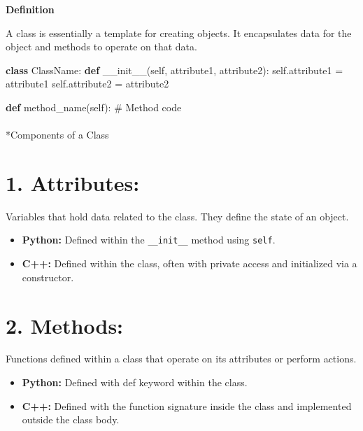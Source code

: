 \documentclass[
  letterpaper,
  DIV=11,
  numbers=noendperiod]{scrreprt}
\makeatletter
\let\oldparagraph\paragraph
\renewcommand{\paragraph}{
    \@ifstar
      \xxxParagraphStar
      \xxxParagraphNoStar
  }
\newcommand{\xxxParagraphStar}[1]{\oldparagraph*{#1}\mbox{}}
\newcommand{\xxxParagraphNoStar}[1]{\oldparagraph{#1}\mbox{}}
\newenvironment{Shaded}{\begin{snugshade}}{\end{snugshade}}
\newcommand{\CommentTok}[1]{\textcolor[rgb]{0.37,0.37,0.37}{#1}}
\newcommand{\FunctionTok}[1]{\textcolor[rgb]{0.28,0.35,0.67}{#1}}
\newcommand{\KeywordTok}[1]{\textcolor[rgb]{0.00,0.23,0.31}{\textbf{#1}}}
\newcommand{\NormalTok}[1]{\textcolor[rgb]{0.00,0.23,0.31}{#1}}
\newcommand{\OperatorTok}[1]{\textcolor[rgb]{0.37,0.37,0.37}{#1}}
\newcommand{\VariableTok}[1]{\textcolor[rgb]{0.07,0.07,0.07}{#1}}
\providecommand{\tightlist}{%
  \setlength{\itemsep}{0pt}\setlength{\parskip}{0pt}}
\makeatother
\begin{document}
\textbf{Definition}

A class is essentially a template for creating objects. It encapsulates
data for the object and methods to operate on that data.

\begin{Shaded}
\begin{Highlighting}[]
\KeywordTok{class}\NormalTok{ ClassName:}
    \KeywordTok{def} \FunctionTok{\_\_init\_\_}\NormalTok{(}\VariableTok{self}\NormalTok{, attribute1, attribute2):}
        \VariableTok{self}\NormalTok{.attribute1 }\OperatorTok{=}\NormalTok{ attribute1}
        \VariableTok{self}\NormalTok{.attribute2 }\OperatorTok{=}\NormalTok{ attribute2}

    \KeywordTok{def}\NormalTok{ method\_name(}\VariableTok{self}\NormalTok{):}
        \CommentTok{\# Method code}
\end{Highlighting}
\end{Shaded}

\paragraph*{Components of a Class}\label{components-of-a-class}

\section{1. Attributes:}

Variables that hold data related to the class. They define the state of
an object.

\begin{itemize}
\tightlist
\item
  \textbf{Python:} Defined within the \texttt{\_\_init\_\_} method using
  \texttt{self}.
\item
  \textbf{C++:} Defined within the class, often with private access and
  initialized via a constructor.
\end{itemize}

\section{2. Methods:}

Functions defined within a class that operate on its attributes or
perform actions.

\begin{itemize}
\tightlist
\item
  \textbf{Python:} Defined with def keyword within the class.
\item
  \textbf{C++:} Defined with the function signature inside the class and
  implemented outside the class body.
\end{itemize}
\end{document}
